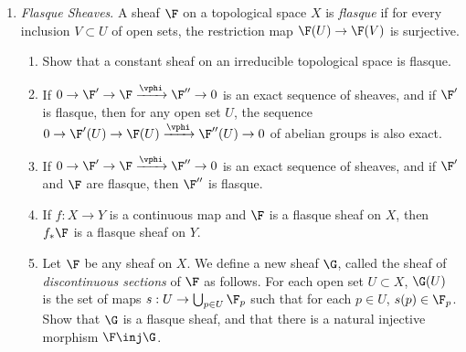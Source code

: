 \documentclass[12pt]{amsart}
\begin{document}
\begin{enumerate}
	\item[1.16.] {
      \emph{Flasque Sheaves}.
      A sheaf $\F$ on a topological space $X$ is \emph{flasque} if for every inclusion $V\subset U$ of open sets, the restriction map $\F(U)\to \F(V)$ is surjective.
      \begin{enumerate}
        \item Show that a constant sheaf on an irreducible topological space is flasque.
        \item If $0\to \F'\to \F\xrightarrow{\vphi} \F''\to 0$ is an exact sequence of sheaves, and if $\F'$ is flasque, then for any open set $U$, the sequence $0\to \F'(U)\to \F(U)\xrightarrow{\vphi} \F''(U)\to 0$ of abelian groups is also exact.
        \item If $0\to \F'\to \F\xrightarrow{\vphi} \F''\to 0$ is an exact sequence of sheaves, and if $\F'$ and $\F$ are flasque, then $\F''$ is flasque.
        \item If $f:X\to Y$ is a continuous map and $\F$ is a flasque sheaf on $X$, then $f_*\F$ is a flasque sheaf on $Y$.
        \item Let $\F$ be any sheaf on $X$.
          We define a new sheaf $\G$, called the sheaf of \emph{discontinuous sections} of $\F$ as follows.
          For each open set $U\subset X$, $\G(U)$ is the set of maps $s:U\to \bigcup_{p\in U}\F_p$ such that for each $p\in U$, $s(p)\in \F_p$.
          Show that $\G$ is a flasque sheaf, and that there is a natural injective morphism $\F\inj \G$.
      \end{enumerate}
    }
\end{enumerate}
\end{document}
